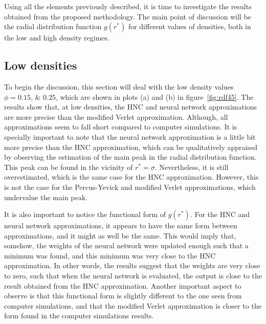 Using all the elements previously described, it is time to investigate the results obtained
from the proposed methodology. The main point of discussion will be the radial distribution
function \textemdash $g(r^*)$ \textemdash for different values of densities, both in the
low and high density regimes.

\subsection{Low densities}
To begin the discussion, this section will deal with the low 
density values $\phi=\numlist{0.15; 0.25}$, which are shown in plots (a) and (b) in 
figure~\ref{fig:rdf45}.
The results show that, at low densities, the HNC and neural network approximations are
more precise than the modified Verlet approximation. Although, all
approximations seem to fall short compared to computer simulations. It is specially
important to note that the neural network approximation is a little bit more precise than
the HNC approximation, which can be qualitatively appraised by observing the estimation of 
the main peak in the radial distribution function. This peak can be found in the vicinity 
of $r^* = \sigma$. Nevertheless, it is still overestimated, which is the same case for the
HNC approximation. However, this is not the case for the Percus-Yevick and modified Verlet 
approximations, which undervalue the main peak.

It is also important to notice the functional form of $g(r^*)$. For the HNC and neural
network approximations, it appears to have the same form between approximations, and it 
might as well be the same. This would imply that, somehow, the weights of the neural network
were updated enough such that a minimum was found, and this minimum was very close to the
HNC approximation. In other words, the results suggest that the weights are very close to
zero, such that when the neural network is evaluated, the output is close to the
result obtained from the HNC approximation.
Another important aspect to observe is that this functional form is slightly different
to the one seen from computer simulations, and that the modified Verlet approximation is 
closer to the form found in the computer simulations results.

